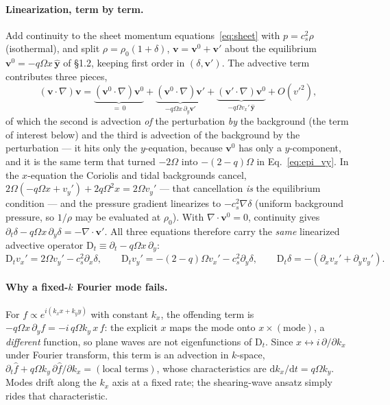 \documentclass[11pt]{article}
\newcommand{\dd}{\mathrm{d}}
\begin{document}
\paragraph{Linearization, term by term.} Add continuity to the sheet momentum
equations~\eqref{eq:sheet} with $p = c_s^2\rho$ (isothermal), and split
$\rho = \rho_0(1+\delta)$, $\mathbf v = \mathbf v^0 + \mathbf v'$ about the
equilibrium $\mathbf v^0 = -q\Omega x\,\hat{\mathbf y}$ of \S1.2, keeping first
order in $(\delta, \mathbf v')$. The advective term contributes three pieces,
\begin{equation}
(\mathbf v\!\cdot\!\nabla)\mathbf v =
\underbrace{(\mathbf v^0\!\cdot\!\nabla)\mathbf v^0}_{=\,0}
+ \underbrace{(\mathbf v^0\!\cdot\!\nabla)\mathbf v'}_{-q\Omega x\,\partial_y\mathbf v'}
+ \underbrace{(\mathbf v'\!\cdot\!\nabla)\mathbf v^0}_{-q\Omega v_x'\,\hat{\mathbf y}}
+ O(v'^2),
\end{equation}
of which the second is advection \emph{of} the perturbation \emph{by} the
background (the term of interest below) and the third is advection of the
background by the perturbation --- it hits only the $y$-equation, because
$\mathbf v^0$ has only a $y$-component, and it is the same term that turned
$-2\Omega$ into $-(2{-}q)\Omega$ in Eq.~\eqref{eq:epi_vy}. In the $x$-equation
the Coriolis and
tidal backgrounds cancel, $2\Omega(-q\Omega x + v_y') + 2q\Omega^2x = 2\Omega
v_y'$ --- that cancellation \emph{is} the equilibrium condition --- and the
pressure gradient linearizes to $-c_s^2\nabla\delta$ (uniform background
pressure, so $1/\rho$ may be evaluated at $\rho_0$). With
$\nabla\!\cdot\!\mathbf v^0 = 0$, continuity gives
$\partial_t\delta - q\Omega x\,\partial_y\delta = -\nabla\!\cdot\!\mathbf v'$.
All three equations therefore carry the \emph{same} linearized advective
operator $\mathrm{D}_t \equiv \partial_t - q\Omega x\,\partial_y$:
\begin{equation}
\mathrm{D}_t v_x' = 2\Omega v_y' - c_s^2\partial_x\delta,
\qquad
\mathrm{D}_t v_y' = -(2{-}q)\Omega v_x' - c_s^2\partial_y\delta,
\qquad
\mathrm{D}_t \delta = -(\partial_x v_x' + \partial_y v_y').
\label{eq:shw_lin}
\end{equation}

\paragraph{Why a fixed-$k$ Fourier mode fails.} For
$f \propto e^{i(k_xx + k_yy)}$ with constant $k_x$, the offending term is
$-q\Omega x\,\partial_y f = -i\,q\Omega k_y\,x\,f$: the explicit $x$ maps the
mode onto $x\times(\text{mode})$, a \emph{different} function, so plane waves are
not eigenfunctions of $\mathrm{D}_t$. Since $x \leftrightarrow i\,\partial/\partial k_x$
under Fourier transform, this term is an advection in $k$-space,
$\partial_t\hat f + q\Omega k_y\,\partial\hat f/\partial k_x = (\text{local
terms})$, whose characteristics are $\dd k_x/\dd t = q\Omega k_y$. Modes drift
along the $k_x$ axis at a fixed rate; the shearing-wave ansatz simply rides that
characteristic.
\end{document}
